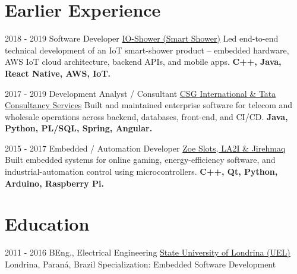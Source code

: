 \documentclass[letterpaper]{twentysecondcv}
\begin{document}
\section{Earlier Experience}
\begin{twenty}

\twentyitem
    {2018 - 2019}
    {Software Developer}
    {\href{http://www.showerio.com}{IO-Shower (Smart Shower)}}
    {}
    {Led end-to-end technical development of an IoT smart-shower product -- embedded hardware, AWS IoT cloud architecture, backend APIs, and mobile apps. \textbf{C++, Java, React Native, AWS, IoT.}}

\twentyitem
    {2017 - 2019}
    {Development Analyst / Consultant}
    {\href{https://www.csgi.com/}{CSG International \& Tata Consultancy Services}}
    {}
    {Built and maintained enterprise software for telecom and wholesale operations across backend, databases, front-end, and CI/CD. \textbf{Java, Python, PL/SQL, Spring, Angular.}}

\twentyitem
    {2015 - 2017}
    {Embedded / Automation Developer}
    {\href{http://la2i.com}{Zoe Slots, LA2I \& Jirehmaq}}
    {}
    {Built embedded systems for online gaming, energy-efficiency software, and industrial-automation control using microcontrollers. \textbf{C++, Qt, Python, Arduino, Raspberry Pi.}}

\end{twenty}

\section{Education}

\begin{twenty}
	\twentyitem
    	{2011 - 2016}
        {BEng., Electrical Engineering}
        {\href{http://www.uel.br}{State University of Londrina (UEL)}}
        {Londrina, Paraná, Brazil}
        {Specialization: Embedded Software Development}
\end{twenty}
\end{document}
